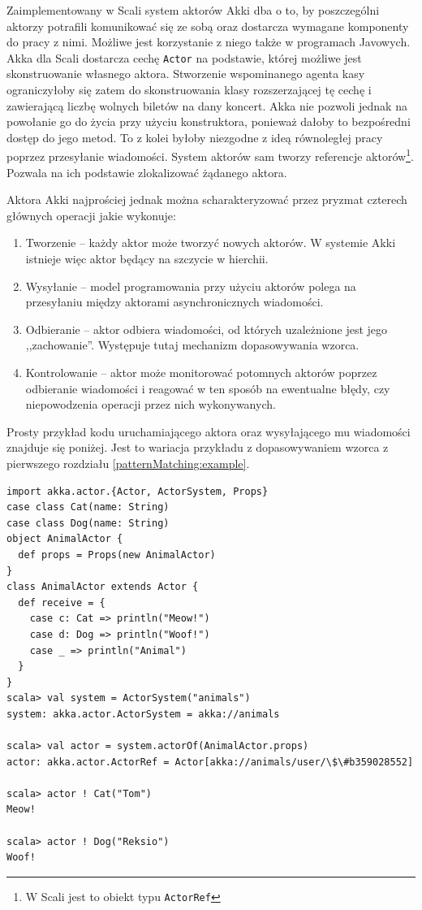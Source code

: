 \documentclass[wimgr]{xmgr}
\begin{document}
Zaimplementowany w Scali system aktorów Akki dba o to, by poszczególni aktorzy potrafili komunikować się ze sobą oraz dostarcza wymagane komponenty do pracy z nimi. Możliwe jest korzystanie z niego także w programach Javowych. Akka dla Scali dostarcza cechę \texttt{Actor} na podstawie, której możliwe jest skonstruowanie własnego aktora. Stworzenie wspominanego agenta kasy ograniczyłoby się zatem do skonstruowania klasy rozszerzającej tę cechę i zawierającą liczbę wolnych biletów na dany koncert. Akka nie pozwoli jednak na powołanie go do życia przy użyciu konstruktora, ponieważ dałoby to bezpośredni dostęp do jego metod. To z kolei byłoby niezgodne z ideą równoległej pracy poprzez przesyłanie wiadomości. System aktorów sam tworzy referencje aktorów\footnote{W Scali jest to obiekt typu \texttt{ActorRef}}. Pozwala na ich podstawie zlokalizować żądanego aktora.

Aktora Akki najprościej jednak można scharakteryzować przez pryzmat czterech głównych operacji jakie wykonuje:

\begin{enumerate}
\item Tworzenie -- każdy aktor może tworzyć nowych aktorów. W systemie Akki istnieje więc aktor będący na szczycie w hierchii.
\item Wysyłanie -- model programowania przy użyciu aktorów polega na przesyłaniu między aktorami asynchronicznych wiadomości. 
\item Odbieranie -- aktor odbiera wiadomości, od których uzależnione jest jego ,,zachowanie''. Występuje tutaj mechanizm dopasowywania wzorca.
\item Kontrolowanie -- aktor może monitorować potomnych aktorów poprzez odbieranie wiadomości i reagować w ten sposób na ewentualne błędy, czy niepowodzenia operacji przez nich wykonywanych.
\end{enumerate}

Prosty przykład kodu uruchamiającego aktora oraz wysyłającego mu wiadomości znajduje się poniżej. Jest to wariacja przykładu z dopasowywaniem wzorca z pierwszego rozdziału \ref{patternMatching:example}.

\begin{verbatim}
import akka.actor.{Actor, ActorSystem, Props}
case class Cat(name: String)
case class Dog(name: String)
object AnimalActor {
  def props = Props(new AnimalActor)
}
class AnimalActor extends Actor {
  def receive = {
    case c: Cat => println("Meow!")
    case d: Dog => println("Woof!")
    case _ => println("Animal")
  }
}
scala> val system = ActorSystem("animals")
system: akka.actor.ActorSystem = akka://animals

scala> val actor = system.actorOf(AnimalActor.props)
actor: akka.actor.ActorRef = Actor[akka://animals/user/\$\#b359028552]

scala> actor ! Cat("Tom")
Meow!

scala> actor ! Dog("Reksio")
Woof!
\end{verbatim}
\end{document}
